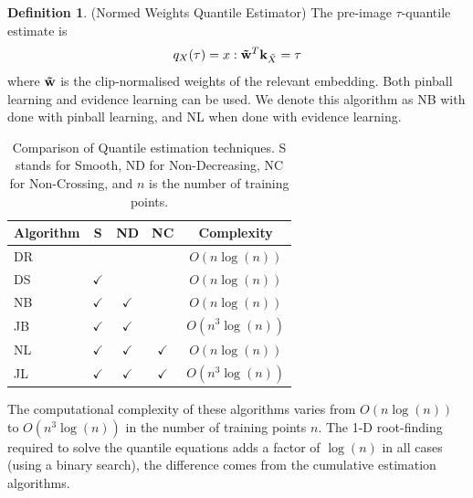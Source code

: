 \documentclass[twoside]{article} \usepackage{aistats2017}
\theoremstyle{definition}
\newtheorem{definition}[theorem]{Definition}
\newcommand{\rv}[1]{{#1}}
\newcommand{\ds}[1]{\tilde{#1}}
\begin{document}
	\theoremstyle{definition}
	\begin{definition}
		(Normed Weights Quantile Estimator)
		The pre-image $\tau$-quantile estimate is
		\begin{equation}
		q_{\rv{X}}(\tau) = x : \bvec{\tilde{w}}^{T} \bvec{k}_{\ds{X}} = \tau
		\end{equation}
		where $\mathbf{\tilde{w}}$ is the clip-normalised weights of the relevant embedding.
		Both pinball learning and evidence learning can be used. We denote this algorithm as NB with done with pinball learning, and NL when done with evidence learning.
	\end{definition}	
	
	\begin{table}[t!]
		\begin{center}
			\begin{tabular}{l|cccc}
				Algorithm & S & ND &   NC & Complexity \\ \hline
				DR  &              &                &                & $O(n \log(n))$    \\
				DS  & $\checkmark$ &                &                &
				$O(n \log(n))$  \\
				NB  & $\checkmark$ & $\checkmark$   &                &
				$O(n \log(n))$ \\
				JB  & $\checkmark$ & $\checkmark$   &                &
				$O(n^{3} \log(n))$ \\
				NL  & $\checkmark$ & $\checkmark$   & $\checkmark$   &
				$O(n \log(n))$ \\
				JL  & $\checkmark$ & $\checkmark$   & $\checkmark$   &   $O(n^{3} \log(n))$ 
			\end{tabular}
		\end{center}
		\caption{\small Comparison of Quantile estimation techniques. S stands for Smooth, ND for Non-Decreasing, NC for Non-Crossing, and $n$ is the number of training points.}
		\label{table:quantile_regression_methods}
	\end{table}
	
		
	The computational complexity of these algorithms varies from $O(n \log(n))$ to $O(n^{3} \log(n))$ in the number of training points $n$. The 1-D root-finding required to solve the quantile equations adds a factor of $\log(n)$ in all cases (using a binary search), the difference comes from the cumulative estimation algorithms.
	
\end{document}
